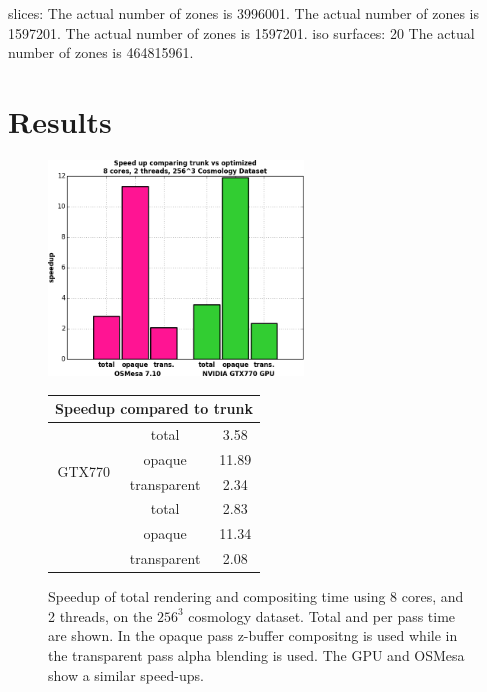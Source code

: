 \documentclass[a4paper,10pt]{report}
\begin{document}
slices:
The actual number of zones is 3996001.
The actual number of zones is 1597201.
The actual number of zones is 1597201.
iso surfaces: 20
The actual number of zones is 464815961.


\section{Results}
 \begin{figure}
 \centering
 \begin{minipage}[c]{0.5\textwidth}
 \begin{center}
 \includegraphics[height=2.25in]{./speed_up_cosmo.png}
 \end{center}
 \end{minipage}
 \begin{minipage}{0.3\textwidth}
 \begin{center}
 \def\arraystretch{1.5}
{\footnotesize
\begin{tabular}{|c|c|c|}
 \hline
 \multicolumn{3}{|c|}{\bf{Speedup compared to trunk}} \\ \hline
\multirow{4}{*}{GTX770} & total & 3.58 \\ \cline{2-3}
 & opaque & 11.89 \\ \cline{2-3}
 & transparent & 2.34 \\ \hline
\multirow{3}{*}{OSMesa} & total & 2.83 \\ \cline{2-3}
 & opaque & 11.34 \\ \cline{2-3}
 & transparent & 2.08 \\ \hline
\end{tabular}} 
\end{center}
\end{minipage}
\caption{Speedup of total rendering and compositing time using 8 cores, and 2 threads, on the $256^3$ cosmology dataset. Total and per pass time are shown. In the opaque pass z-buffer compositng is used while in the transparent pass alpha blending is used. The GPU and OSMesa show a similar speed-ups.}
\label{fig:speedup_cosmo}
\end{figure}
\end{document}
